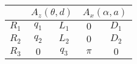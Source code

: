 \begin{tabular}{c|c|c|c|c|}  
            \cline{2-5} &
            \multicolumn{2}{|c|}{$A_z(\theta,d)$} &
            \multicolumn{2}{|c|}{$A_x(\alpha,a)$} \\
            \hline
        \multicolumn{1}{|c|}{$R_1$} & $q_{1}$ & $L_{1}$ & $0$ & $D_{1}$ \\
            \hline
        \multicolumn{1}{|c|}{$R_2$} & $q_{2}$ & $L_{2}$ & $0$ & $D_{2}$ \\
            \hline
        \multicolumn{1}{|c|}{$R_3$} & $0$ & $q_{3}$ & $\pi$ & $0$ \\
            \hline
\end{tabular}
